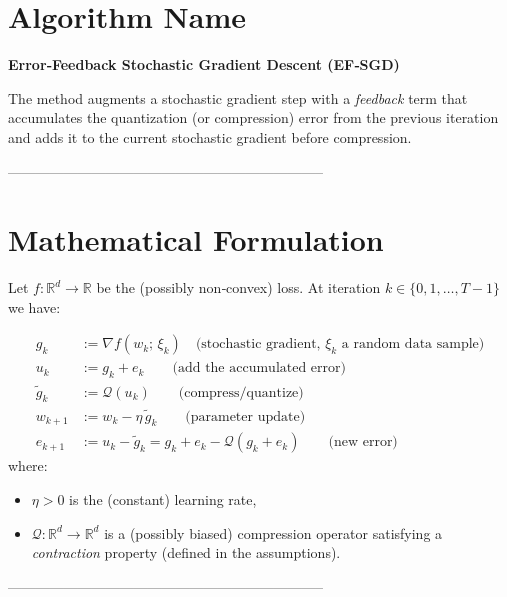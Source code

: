 \documentclass{article}
\begin{document}
\section*{Algorithm Name}
\textbf{Error‑Feedback Stochastic Gradient Descent (EF‑SGD)}  

The method augments a stochastic gradient step with a \emph{feedback} term that accumulates the quantization (or compression) error from the previous iteration and adds it to the current stochastic gradient before compression.

\vspace{0.5em}
--------------------------------------------------------------------

\section*{Mathematical Formulation}
Let $f:\mathbb{R}^d\rightarrow\mathbb{R}$ be the (possibly non‑convex) loss.  
At iteration $k\in\{0,1,\dots,T-1\}$ we have:

\begin{align}
    g_k &:= \nabla f(w_k;\,\xi_k) \quad\text{(stochastic gradient, }\xi_k\text{ a random data sample)}\label{eq:sg}\\
    u_k &:= g_k + e_k \qquad\text{(add the accumulated error)}\tag{1}\\
    \tilde g_k &:= \mathcal{Q}(u_k) \qquad\text{(compress/quantize)}\tag{2}\\
    w_{k+1} &:= w_k - \eta \,\tilde g_k \qquad\text{(parameter update)}\tag{3}\\
    e_{k+1} &:= u_k - \tilde g_k = g_k + e_k - \mathcal{Q}(g_k+e_k) \qquad\text{(new error)}\tag{4}
\end{align}
where:
\begin{itemize}
    \item $\eta>0$ is the (constant) learning rate,
    \item $\mathcal{Q}:\mathbb{R}^d\rightarrow\mathbb{R}^d$ is a (possibly biased) compression operator satisfying a \emph{contraction} property (defined in the assumptions).
\end{itemize}

--------------------------------------------------------------------
\end{document}
